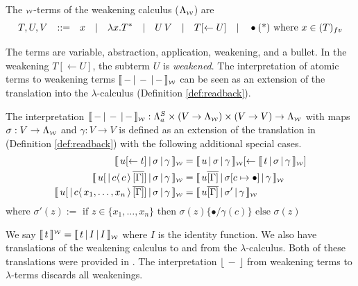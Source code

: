 \documentclass[runningheads]{llncs}
\newcommand{\FALC}{\Lambda^{S}_{a}}
\newcommand{\WEAK}{\Lambda_{\weaksymbol}}
\newcommand{\fv}[1]{(#1)_{fv}}
\newcommand{\set}[1]{ \{ #1 \} }
\newcommand{\abs}[2]{\lambda #1 . #2}
\newcommand{\app}[2]{#1 \, #2}
\newcommand{\share}[3]{#1 [#2 \leftarrow #3]}
\newcommand{\dist}[5]{#1 [ #2 \, \vert \, \fakedist{#4}{#5} \, #3 ]}
\newcommand{\fakedist}[2]{#1 \langle \, #2 \, \rangle}
\newcommand{\sub}[3]{#1 \{ #2 / #3 \}}
\newcommand{\weaksymbol}{\mbox{\tiny $\mathcal{W}$}}
\newcommand{\readweakwmap}[3]{\llbracket \, #1 \, \vert \, #2 \, \vert \, #3  \, \rrbracket_{\weaksymbol} }
\newcommand{\readbackweak}[1]{\lfloor \, #1 \, \rfloor}
\newcommand{\composeweak}[1]{\llbracket \, #1 \, \rrbracket^{\weaksymbol}}
\begin{document}
\begin{definition}
\label{def:weakterms}
The $\weaksymbol$-terms of the weakening calculus ($\WEAK$) are
\begin{equation*}
	T, U, V \quad {:}{:}{=} \quad x \quad \vert \quad \abs{x}{T^{*}}\quad \vert \quad \app{U}{V} \quad \vert \quad \share{T}{}{U} \quad \vert \quad \bullet \hfill \text{(*) where $x \in \fv{T}$}
\end{equation*}
\end{definition}

The terms are variable, abstraction, application, weakening, and a bullet. In the weakening $\share{T}{}{U}$, the subterm $U$ is \emph{weakened}. The interpretation of atomic terms to weakening terms $\readweakwmap{-}{-}{-}$ can be seen as an extension of the translation into the $\lambda$-calculus (Definition \ref{def:readback}).

\begin{definition}
\label{def:transfalcweak}
	The interpretation $\readweakwmap{-}{-}{-} : \FALC \times (V \rightarrow \WEAK) \times (V \rightarrow V) \rightarrow \WEAK$ with maps $\sigma : V \rightarrow \WEAK$ and $\gamma : V \rightarrow V$ is defined as an extension of the translation in (Definition \ref{def:readback}) with the following additional special cases.
	\begingroup
	\allowdisplaybreaks
	\begin{align*}
		\readweakwmap{\share{u}{}{t}}{\sigma}{\gamma} &= \share{\readweakwmap{u}{\sigma}{\gamma}}{}{\readweakwmap{t}{\sigma}{\gamma}} \\
		\readweakwmap{\dist{u}{}{\overline{[\Gamma]}}{c}{c}}{\sigma}{\gamma} &= \readweakwmap{u \overline{[\Gamma]}}{\sigma[c \mapsto \bullet]}{\gamma} \\
		\readweakwmap{\dist{u}{}{\overline{[\Gamma]}}{c}{x_{1}, \dots, x_{n}}}{\sigma}{\gamma} &= \readweakwmap{u \overline{[\Gamma]}}{\sigma'}{\gamma}
	\end{align*}
where  $\sigma'(z) := \text{ if } z \in \set{x_{1}, \dots, x_{n}} \text{ then } \sigma(z) \sub{}{\bullet}{\gamma(c)}  \text{ else } \sigma(z)$
	\endgroup
\end{definition}

\noindent We say $\composeweak{t} = \readweakwmap{t}{I}{I}$ where $I$ is the identity function. We also have translations of the weakening calculus to and from the $\lambda$-calculus. Both of these translations were provided in \cite{Gundersen-Heijltjes-Parigot-2013-LICS}. The interpretation $\readbackweak{-}$ from weakening terms to $\lambda$-terms discards all weakenings. 
\end{document}
